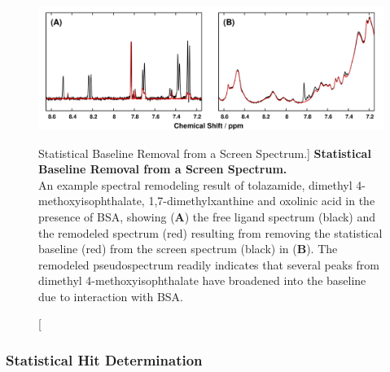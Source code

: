 \begin{figure}[ht!]
\includegraphics[width=6.5in]{figs/pscorr/06-ussrfit.png}
\caption
      [Statistical Baseline Removal from a Screen Spectrum.]{
  {\bf Statistical Baseline Removal from a Screen Spectrum.}
  \\
  An example spectral remodeling result of tolazamide, dimethyl
  4-methoxyisophthalate, 1,7-dimethylxanthine and oxolinic acid in the
  presence of BSA, showing ({\bf A}) the free ligand spectrum (black) and
  the remodeled spectrum (red) resulting from removing the statistical
  baseline (red) from the screen spectrum (black) in ({\bf B}). The remodeled
  pseudospectrum readily indicates that several peaks from dimethyl
  4-methoxyisophthalate have broadened into the baseline due to interaction
  with BSA.
}
\end{figure}

\subsubsection{Statistical Hit Determination}

